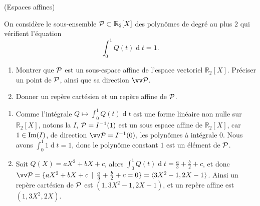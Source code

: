 \documentclass[a4paper,12pt,reqno]{amsart}
\begin{document}
\begin{exo} (Espaces affines)

  On considère le sous-ensemble $\mathcal{P} \subset \mathbb{R}_{2}[X]$ des polynômes de degré au plus $2$ qui vérifient l'équation
  \[
    \int_{0}^{1}Q(t)\operatorname{d}\!t=1.
  \]
  \begin{enumerate}
    \item Montrer que $\mathcal{P}$ est un sous-espace affine de l'espace vectoriel $\mathbb{R}_{2}[X]$. Préciser un point de $\mathcal{P}$, ainsi que sa direction $\ev{P}$.
    \item Donner un repère cartésien et un repère affine de $\mathcal{P}$.
  \end{enumerate}



\end{exo}

\begin{solution}
  \begin{enumerate}
    \item Comme l'intégrale $Q \mapsto \int_{0}^{1}Q(t)\operatorname{d}\!t $ est une forme linéaire non nulle sur $\mathbb{R}_{2}[X]$, notons la $I$, $\mathcal{P}=I^{-1}(1)$ est un sous espace affine de $\mathbb{R}_{2}[X]$, car $1 \in \operatorname{Im}(I)$, de direction $\ev{P}=I^{-1}(0)$, les polynômes à intégrale $0$. Nous avons $\int_{0}^{1}1\operatorname{d}\!t=1$, donc le polynôme constant $1$ est un élément de $\mathcal{P}$.
    \item Soit $Q(X)=aX^{2}+bX+c$, alors $\int_{0}^{1}Q(t)\operatorname{d}\!t=\frac{a}{3}+\frac{b}{2}+c$, et donc $\ev{P} = \{aX^{2}+bX+c \,\mid\, \frac{a}{3}+\frac{b}{2}+c=0\}=\affspan{3X^{2}-1, 2X-1}$. Ainsi un repère cartésien de $\mathcal{P}$ est $\left(1,3X^{2}-1,2X-1\right)$, et un repère affine est $\left(1,3X^{2},2X\right)$.
  \end{enumerate}
\end{solution}
\end{document}
